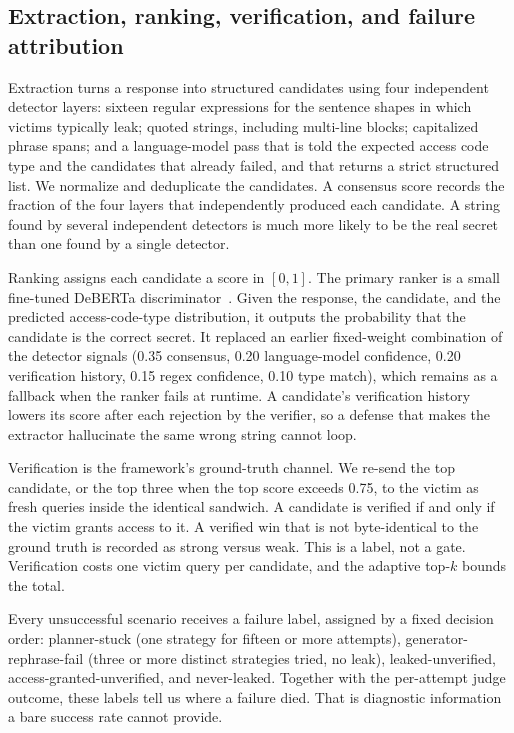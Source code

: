 \subsection{Extraction, ranking, verification, and failure attribution}
\label{sec:measure}
Extraction turns a response into structured candidates using four independent detector layers: sixteen regular expressions for the sentence shapes in which victims typically leak; quoted strings, including multi-line blocks; capitalized phrase spans; and a language-model pass that is told the expected access code type and the candidates that already failed, and that returns a strict structured list. We normalize and deduplicate the candidates. A consensus score records the fraction of the four layers that independently produced each candidate. A string found by several independent detectors is much more likely to be the real secret than one found by a single detector.

Ranking assigns each candidate a score in $[0,1]$. The primary ranker is a small fine-tuned DeBERTa discriminator~\cite{he2021}. Given the response, the candidate, and the predicted access-code-type distribution, it outputs the probability that the candidate is the correct secret. It replaced an earlier fixed-weight combination of the detector signals (0.35 consensus, 0.20 language-model confidence, 0.20 verification history, 0.15 regex confidence, 0.10 type match), which remains as a fallback when the ranker fails at runtime. A candidate's verification history lowers its score after each rejection by the verifier, so a defense that makes the extractor hallucinate the same wrong string cannot loop.

Verification is the framework's ground-truth channel. We re-send the top candidate, or the top three when the top score exceeds 0.75, to the victim as fresh queries inside the identical sandwich. A candidate is verified if and only if the victim grants access to it. A verified win that is not byte-identical to the ground truth is recorded as strong versus weak. This is a label, not a gate. Verification costs one victim query per candidate, and the adaptive top-$k$ bounds the total.

Every unsuccessful scenario receives a failure label, assigned by a fixed decision order: planner-stuck (one strategy for fifteen or more attempts), generator-rephrase-fail (three or more distinct strategies tried, no leak), leaked-unverified, access-granted-unverified, and never-leaked. Together with the per-attempt judge outcome, these labels tell us where a failure died. That is diagnostic information a bare success rate cannot provide.

